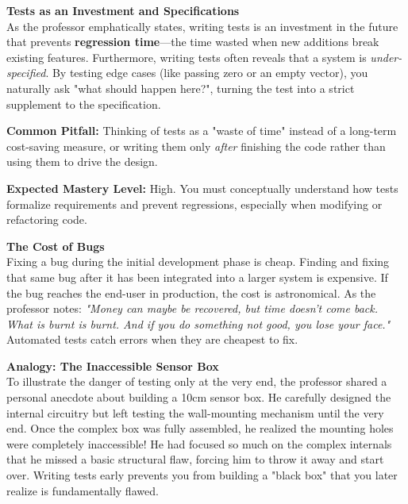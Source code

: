 \begin{examprioritybox}
\textbf{Tests as an Investment and Specifications}\\
As the professor emphatically states, writing tests is an investment in the future that prevents \textbf{regression time}---the time wasted when new additions break existing features. Furthermore, writing tests often reveals that a system is \textit{under-specified}. By testing edge cases (like passing zero or an empty vector), you naturally ask "what should happen here?", turning the test into a strict supplement to the specification. 

\textbf{Common Pitfall:} Thinking of tests as a "waste of time" instead of a long-term cost-saving measure, or writing them only \textit{after} finishing the code rather than using them to drive the design.

\textbf{Expected Mastery Level:} High. You must conceptually understand how tests formalize requirements and prevent regressions, especially when modifying or refactoring code.
\end{examprioritybox}

\begin{insightbox}
\textbf{The Cost of Bugs}\\
Fixing a bug during the initial development phase is cheap. Finding and fixing that same bug after it has been integrated into a larger system is expensive. If the bug reaches the end-user in production, the cost is astronomical. As the professor notes: \textit{"Money can maybe be recovered, but time doesn't come back. What is burnt is burnt. And if you do something not good, you lose your face."} Automated tests catch errors when they are cheapest to fix.
\end{insightbox}

\begin{insightbox}
\textbf{Analogy: The Inaccessible Sensor Box}\\
To illustrate the danger of testing only at the very end, the professor shared a personal anecdote about building a 10cm sensor box. He carefully designed the internal circuitry but left testing the wall-mounting mechanism until the very end. Once the complex box was fully assembled, he realized the mounting holes were completely inaccessible! He had focused so much on the complex internals that he missed a basic structural flaw, forcing him to throw it away and start over. Writing tests early prevents you from building a "black box" that you later realize is fundamentally flawed.
\end{insightbox}

